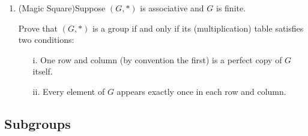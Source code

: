 \begin{exercises}
\begin{enumerate}
  
  \item\label{exs:magicsquare} (Magic Square)\quad Suppose $(G,*)$ is associative and $G$ is finite.\par
  Prove that $(G,*)$ is a group if and only if its (multiplication) table satisfies two conditions:
		\begin{itemize}\itemsep0pt
		  \item[i.] One row and column (by convention the first) is a perfect copy of $G$ itself.
  		\item[ii.] Every element of $G$ appears exactly once in each row and column.
		\end{itemize}
	
 
% 		
%     
  

	\end{enumerate}
	\end{exercises}

\clearpage

\subsection{Subgroups}\label{sec:subgroup}

